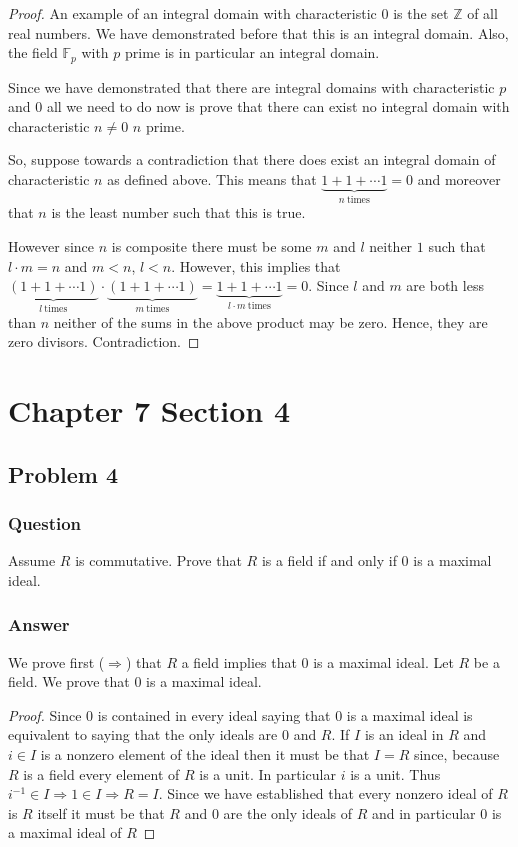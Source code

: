 \documentclass[12pt]{article}
\begin{document}
\begin{proof}
An example of an integral domain with characteristic $0$ is the set $\mathbb{Z}$ of all real numbers. We have demonstrated before that this is an integral domain. Also, the field $\mathbb{F}_p$ with $p$ prime is in particular an integral domain.

Since we have demonstrated that there are integral domains with characteristic $p$ and 0 all we need to do now is prove that there can exist no integral domain with characteristic $n \neq 0$ $n$ prime.

So, suppose towards a contradiction that there does exist an integral domain of characteristic $n$ as defined above. This means that $\underbrace{1+1+\cdots 1}_{n \mathrm{\ times}}=0$ and moreover that $n$ is the least number such that this is true.

However since $n$ is composite there must be some $m$ and $l$ neither $1$ such that $l \cdot m = n$ and $m<n$, $l<n$. However, this implies that $\underbrace{(1+1+\cdots 1)}_{l \mathrm{\ times}} \cdot \underbrace{(1+1+\cdots 1)}_{m \mathrm{\ times}} = \underbrace{1+1+\cdots 1}_{l \cdot m \mathrm{\ times}} = 0$. Since $l$ and $m$ are both less than $n$ neither of the sums in the above product may be zero. Hence, they are zero divisors. Contradiction.
\end{proof}




\section{Chapter 7 Section 4}
\subsection{Problem 4}

\subsubsection{Question}
Assume $R$ is commutative. Prove that $R$ is a field if and only if 0 is a maximal ideal.
\subsubsection{Answer}
We prove first ($\Rightarrow$) that $R$ a field implies that $0$ is a maximal ideal. Let $R$ be a field. We prove that $0$ is a maximal ideal.

\begin{proof}
Since 0 is contained in every ideal saying that 0 is a maximal ideal is equivalent to saying that the only ideals are 0 and $R$. If $I$ is an ideal in $R$ and $i \in I$ is a nonzero element of the ideal then it must be that $I = R$ since, because $R$ is a field every element of $R$ is a unit. In particular $i$ is a unit. Thus $i^{-1} \in I \Rightarrow 1 \in I \Rightarrow R = I$. Since we have established that every nonzero ideal of $R$ is $R$ itself it must be that $R$ and $0$ are the only ideals of $R$ and in particular $0$ is a maximal ideal of $R$
\end{proof}
\end{document}
